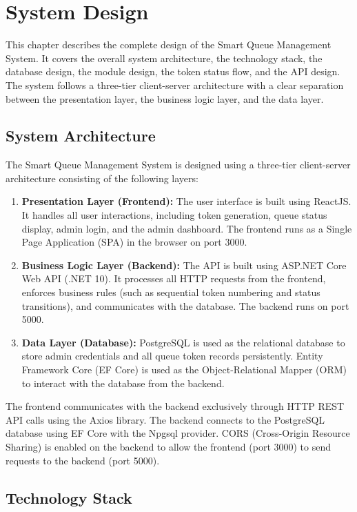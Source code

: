 \chapter{System Design}

This chapter describes the complete design of the Smart Queue Management System. It covers the overall system architecture, the technology stack, the database design, the module design, the token status flow, and the API design. The system follows a three-tier client-server architecture with a clear separation between the presentation layer, the business logic layer, and the data layer.

\section{System Architecture}

The Smart Queue Management System is designed using a three-tier client-server architecture consisting of the following layers:

\begin{enumerate}
    \item \textbf{Presentation Layer (Frontend):} The user interface is built using ReactJS. It handles all user interactions, including token generation, queue status display, admin login, and the admin dashboard. The frontend runs as a Single Page Application (SPA) in the browser on port 3000.
    \item \textbf{Business Logic Layer (Backend):} The API is built using ASP.NET Core Web API (.NET 10). It processes all HTTP requests from the frontend, enforces business rules (such as sequential token numbering and status transitions), and communicates with the database. The backend runs on port 5000.
    \item \textbf{Data Layer (Database):} PostgreSQL is used as the relational database to store admin credentials and all queue token records persistently. Entity Framework Core (EF Core) is used as the Object-Relational Mapper (ORM) to interact with the database from the backend.
\end{enumerate}

The frontend communicates with the backend exclusively through HTTP REST API calls using the Axios library. The backend connects to the PostgreSQL database using EF Core with the Npgsql provider. CORS (Cross-Origin Resource Sharing) is enabled on the backend to allow the frontend (port 3000) to send requests to the backend (port 5000).

\section{Technology Stack}

